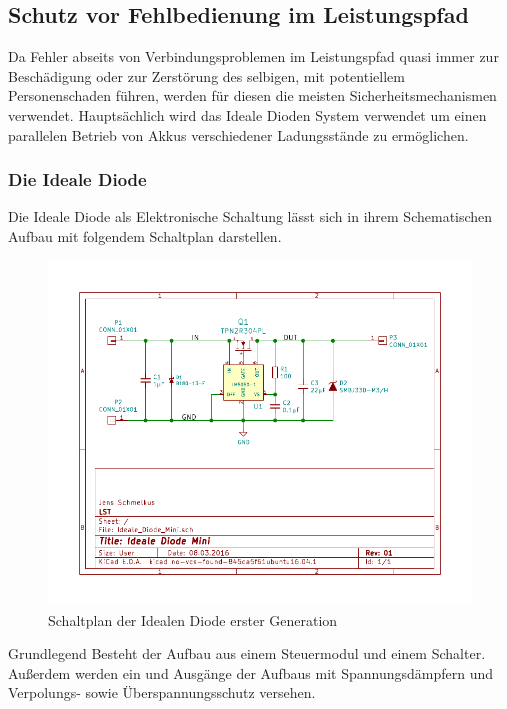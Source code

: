 \subsection{Schutz vor Fehlbedienung im Leistungspfad}

Da Fehler abseits von Verbindungsproblemen im Leistungspfad quasi immer zur Beschädigung oder zur Zerstörung des selbigen, mit potentiellem Personenschaden führen, werden für diesen die meisten Sicherheitsmechanismen verwendet.
Hauptsächlich wird das Ideale Dioden System verwendet um einen parallelen Betrieb von Akkus verschiedener Ladungsstände zu ermöglichen.

\subsubsection{Die Ideale Diode}

Die Ideale Diode als Elektronische Schaltung lässt sich in ihrem Schematischen Aufbau mit folgendem Schaltplan darstellen.

\begin{figure}[H]
\centering
\includegraphics[width=1.0\textwidth]{Schaltplaene/Ideale_Diode_Mini.pdf} 
\caption{Schaltplan der Idealen Diode erster Generation} 
\label{fig:Schaltplan der Idealen Diode erster Generation}
\end{figure}

Grundlegend Besteht der Aufbau aus einem Steuermodul und einem Schalter. Außerdem werden ein und Ausgänge der Aufbaus mit Spannungsdämpfern und Verpolungs- sowie Überspannungsschutz versehen.

